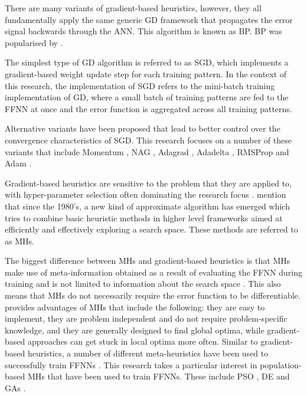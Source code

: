 \documentclass[preprint,review,12pt]{elsarticle}
\begin{document}
There are many variants of gradient-based heuristics, however, they all fundamentally apply the same generic \acs{GD} framework that propagates the error signal backwards through the \acs{ANN}. This algorithm is known as \acf{BP}. \acs{BP} was popularised by \citet{ref:werbos:1994}.

The simplest type of \acs{GD} algorithm is referred to as \acs{SGD}, which implements a gradient-based weight update step for each training pattern. In the context of this research, the implementation of \acs{SGD} refers to the mini-batch training implementation of \acs{GD}, where a small batch of training patterns are fed to the \acs{FFNN} at once and the error function is aggregated across all training patterns.

Alternative variants have been proposed that lead to better control over the convergence characteristics of \acs{SGD}. This research focuses on a number of these variants that include \acf{Momentum} \citep{ref:qian:1999}, \acf{NAG} \citep{ref:sutskever:2013}, \acf{Adagrad} \citep{ref:duchi:2011}, \acs{Adadelta} \citep{ref:zeiler:2012}, \acf{RMSProp} \citep{ref:hinton:2012} and \acf{Adam} \citep{ref:kingma:2014}.

Gradient-based heuristics are sensitive to the problem that they are applied to, with hyper-parameter selection often dominating the research focus \citep{ref:bengio:2000}. \citet{ref:blum:2003} mention that since the 1980's, a new kind of approximate algorithm has emerged which tries to combine basic heuristic methods in higher level frameworks aimed at efficiently and effectively exploring a search space. These methods are referred to as \acp{MH}.

The biggest difference between \acp{MH} and gradient-based heuristics is that \acp{MH} make use of meta-information obtained as a result of evaluating the \acs{FFNN} during training and is not limited to information about the search space \citep{ref:blum:2003}. This also means that \acp{MH} do not necessarily require the error function to be differentiable. \citet{ref:blum:2003} provides advantages of \acp{MH} that include the following: they are easy to implement, they are problem independent and do not require problem-specific knowledge, and they are generally designed to find global optima, while gradient-based approaches can get stuck in local optima more often. Similar to gradient-based heuristics, a number of different meta-heuristics have been used to successfully train \acp{FFNN} \citep{ref:rakitianskaia:2012, ref:vanwyk:2014, ref:gupta:1999}. This research takes a particular interest in population-based \acp{MH} that have been used to train \acp{FFNN}. These include \acf{PSO} \citep{ref:shi:1998}, \acf{DE} \citep{ref:price:2006} and \acfp{GA} \citep{ref:fraser:1957}.
\end{document}
